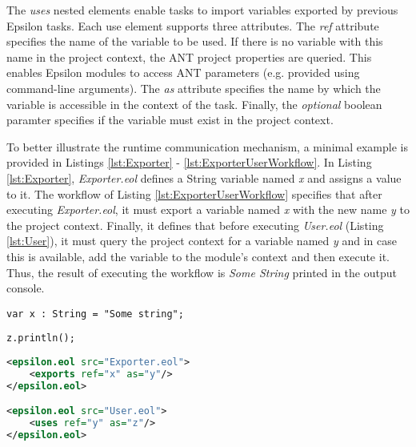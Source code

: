 The \emph{uses} nested elements enable tasks to import variables exported by previous Epsilon tasks. Each use element supports three attributes. The \emph{ref} attribute specifies the name of the variable to be used. If there is no variable with this name in the project context, the ANT project properties are queried. This enables Epsilon modules to access ANT parameters (e.g. provided using command-line arguments). The \emph{as} attribute specifies the name by which the variable is accessible in the context of the task. Finally, the \emph{optional} boolean paramter specifies if the variable must exist in the project context.

To better illustrate the runtime communication mechanism, a minimal example is provided in Listings \ref{lst:Exporter} - \ref{lst:ExporterUserWorkflow}. In Listing \ref{lst:Exporter}, \emph{Exporter.eol} defines a String variable named \emph{x} and assigns a value to it. The workflow of Listing \ref{lst:ExporterUserWorkflow} specifies that after executing \emph{Exporter.eol}, it must export a variable named \emph{x} with the new name \emph{y} to the project context. Finally, it defines that before executing \emph{User.eol} (Listing \ref{lst:User}), it must query the project context for a variable named \emph{y} and in case this is available, add the variable to the module's context and then execute it. Thus, the result of executing the workflow is \emph{Some String} printed in the output console.

\begin{lstlisting}[basicstyle=\ttfamily\footnotesize, nolol=true, flexiblecolumns=true, caption=Source code of the Exporter.eol module, label=lst:Exporter, language=EOL]
var x : String = "Some string";
\end{lstlisting}

\begin{lstlisting}[basicstyle=\ttfamily\footnotesize, nolol=true, flexiblecolumns=true, caption=Source code of the User.eol module, label=lst:User, language=EOL]
z.println();
\end{lstlisting}

\begin{lstlisting}[basicstyle=\ttfamily\footnotesize, nolol=true, flexiblecolumns=true, caption=ANT Workflow connecting modules  \ref{lst:Exporter} and \ref{lst:User} using the epsilon.eol task, label=lst:ExporterUserWorkflow , language=XML]
<epsilon.eol src="Exporter.eol">
	<exports ref="x" as="y"/>
</epsilon.eol>

<epsilon.eol src="User.eol">
	<uses ref="y" as="z"/>
</epsilon.eol>
\end{lstlisting}